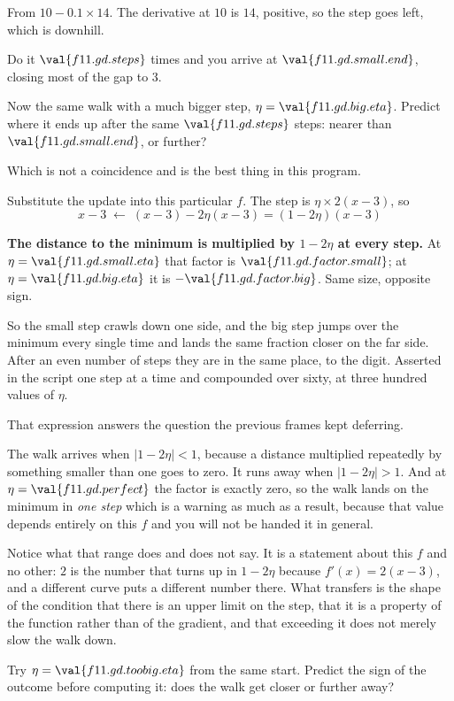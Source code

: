 \begin{fr}
From $10 - \num{0.1} \times 14$. The derivative at $10$ is $14$, positive, so
the step goes left, which is downhill.

Do it $\val{f11.gd.steps}$ times and you arrive at
$\val{f11.gd.small.end}$, closing most of the gap to $3$.

Now the same walk with a much bigger step, $\eta =
\val{f11.gd.big.eta}$. Predict where it ends up after the same
$\val{f11.gd.steps}$ steps: nearer than $\val{f11.gd.small.end}$, or further?
\dotline
\nextframe
\end{fr}

\begin{fr}
Which is not a coincidence and is the best thing in this program.

Substitute the update into this particular $f$. The step is
$\eta \times 2(x-3)$, so
\[ x - 3 \;\longleftarrow\; (x - 3) - 2\eta(x - 3) = (1 - 2\eta)(x - 3) \]

\textbf{The distance to the minimum is multiplied by $1 - 2\eta$ at every
step.} At $\eta = \val{f11.gd.small.eta}$ that factor is
$\val{f11.gd.factor.small}$; at $\eta = \val{f11.gd.big.eta}$ it is
$-\val{f11.gd.factor.big}$. Same size, opposite sign.

So the small step crawls down one side, and the big step jumps over the
minimum every single time and lands the same fraction closer on the far side.
After an even number of steps they are in the same place, to the digit.
Asserted in the script one step at a time and compounded over sixty, at three
hundred values of $\eta$.
\end{fr}

\begin{fr}
That expression answers the question the previous frames kept deferring.

The walk arrives when $\lvert 1 - 2\eta \rvert < 1$, because a distance
multiplied repeatedly by something smaller than one goes to zero. It runs away
when $\lvert 1 - 2\eta \rvert > 1$. And at $\eta = \val{f11.gd.perfect}$ the
factor is exactly zero, so the walk lands on the minimum in \emph{one step}
\dash{} which is a warning as much as a result, because that value depends
entirely on this $f$ and you will not be handed it in general.

Notice what that range does and does not say. It is a statement about this
$f$ and no other: $2$ is the number that turns up in $1 - 2\eta$ because
$f'(x) = 2(x-3)$, and a different curve puts a different number there. What
transfers is the shape of the condition \dash{} that there is an upper limit
on the step, that it is a property of the function rather than of the
gradient, and that exceeding it does not merely slow the walk down.

Try $\eta = \val{f11.gd.toobig.eta}$ from the same start. Predict the sign of
the outcome before computing it: does the walk get closer or further away?
\dotline
\nextframe
\end{fr}

